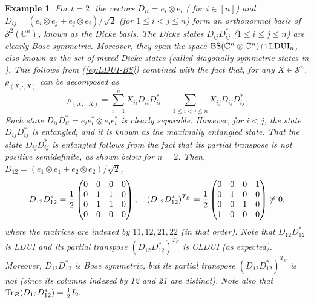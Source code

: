 \documentclass[11pt]{article}
\newcommand{\C}{\ensuremath{\mathbb{C}}} %
\newcommand{\MS}{{\mathcal S}}
\newcommand{\Cnn}{\C^n\ot \C^n}
\newcommand{\LDUI}{\text{\rm LDUI}}
\newcommand{\Tr}{\text{\rm Tr}}
\newcommand{\ot}{\otimes}
\newcommand{\BS}{\text{\rm BS}}
\theoremstyle{plain}
\newtheorem{example}[satz]{Example}
\begin{document}
\begin{example}\label{ex:Dicke}
For $t=2$, the vectors  $D_{ii}=e_i\ot e_i$ ( for $i\in [n]$) and $D_{ij}=(e_i\ot e_j+ e_j\ot e_i)/\sqrt 2$
(for $1\le i< j\le n$) form an orthonormal basis of $\MS^2(\C^n)$, known as the {\em Dicke basis}.
The  {\em Dicke states} $D_{ij}D_{ij}^*$ ($1\le i\le j\le n$) are clearly Bose symmetric. Moreover, they span the space $\BS(\Cnn)\cap \LDUI_n$, also known as the set of {\em mixed Dicke states} \cite{GNP_2025} (called {\em diagonally symmetric states} in \cite{Marconi_2021,Tura_2018}). This follows from (\ref{eq:LDUI-BS}) combined with the  fact that, for any $X\in\MS^n$, $\rho_{(X,\cdot,X)}$ can be decomposed as
$$\rho_{(X,\cdot,X)}= 
\sum_{i=1}^n X_{ii} D_{ii}D_{ii}^*+\sum_{1\le i<j\le n} X_{ij} D_{ij}D_{ij}^*.
$$
Each  state $D_{ii}D_{ii}^*= e_ie_i^*\ot e_ie_i^*$ is clearly separable. However, for $i<j$,  the state $D_{ij}D_{ij}^*$ is entangled, and it is known as the {\em maximally entangled state}. That the state $D_{ij}D_{ij}^*$ is entangled follows   from the fact that its partial transpose is not positive semidefinite, as shown below for $n=2$. Then, $D_{12}=(e_1\ot e_1+e_2\ot e_2)/\sqrt 2$,  
$$
D_{12}D_{12}^*={1\over 2} \begin{pmatrix} 0 & 0 & 0 & 0\cr 0 & 1 & 1 & 0\cr 0 & 1 & 1 & 0\cr 0 & 0 & 0 &0\end{pmatrix},\quad 
(D_{12}D_{12}^*)^{T_B}={1\over 2} \begin{pmatrix} 0 & 0 & 0 & 1\cr 0 & 1 & 0 & 0\cr 0 & 0 & 1 & 0\cr 1 & 0 & 0 &0\end{pmatrix}\not\succeq 0,
$$
where the matrices are indexed by $11, 12, 21, 22$ (in that order).
Note that $D_{12}D_{12}^*$ is LDUI  and its partial transpose $(D_{12}D_{12}^*)^{T_B}$ is CLDUI (as expected). Moreover, $D_{12}D_{12}^*$ is Bose symmetric, but its partial transpose $(D_{12}D_{12}^*)^{T_B}$ is not (since its columns indexed by 12 and 21 are distinct). 
Note also that $\Tr_B(D_{12}D_{12}^*)={1\over 2}I_2.$
\end{example}
\end{document}
